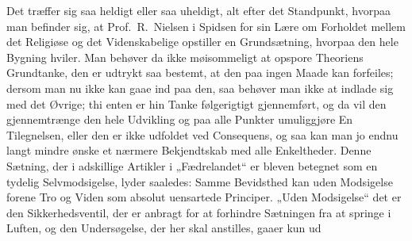Det træffer sig saa heldigt eller saa uheldigt, alt efter det
Standpunkt, hvorpaa man befinder sig, at Prof.\ R.\ Nielsen i Spidsen for sin
Lære om Forholdet mellem det Religiøse og det Videnskabelige opstiller en
Grundsætning, hvorpaa den hele Bygning hviler. Man behøver da ikke
møisommeligt at opspore Theoriens Grundtanke, den er udtrykt saa bestemt, at
den paa ingen Maade kan forfeiles; dersom man nu ikke kan gaae ind paa den,
saa behøver man ikke at indlade sig med det Øvrige; thi enten er hin Tanke
følgerigtigt gjennemført, og da vil den gjennemtrænge den hele Udvikling og
paa alle Punkter umuliggjøre En Tilegnelsen, eller den er ikke udfoldet ved
Consequens, og saa kan man jo endnu langt mindre ønske et nærmere
Bekjendtskab med alle Enkeltheder. Denne Sætning, der i adskillige Artikler i
„Fædrelandet“ er bleven betegnet som en tydelig Selvmodsigelse, lyder
saaledes: Samme Bevidsthed kan uden Modsigelse forene Tro og Viden som
absolut uensartede Principer. „Uden Modsigelse“ det er den Sikkerhedsventil,
der er anbragt for at forhindre Sætningen fra at springe
i Luften, og den Undersøgelse, der her skal anstilles, gaaer kun ud
